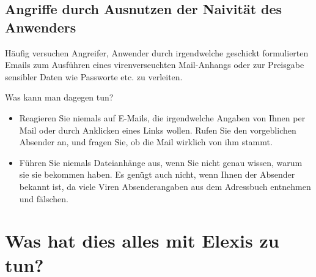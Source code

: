 \subsection{Angriffe durch Ausnutzen der Naivität des Anwenders}

Häufig versuchen Angreifer, Anwender durch irgendwelche geschickt formulierten Emails zum Ausführen eines virenverseuchten Mail-Anhangs oder
zur Preisgabe sensibler Daten wie Passworte etc. zu verleiten.

\medskip

Was kann man dagegen tun?

\begin{itemize}
    \item{Reagieren Sie niemals auf E-Mails, die irgendwelche Angaben von Ihnen per Mail oder durch Anklicken eines Links wollen.
    Rufen Sie den vorgeblichen Absender an, und fragen Sie, ob die Mail wirklich von ihm stammt.}
    \item{Führen Sie niemals Dateianhänge aus, wenn Sie nicht genau wissen, warum sie sie bekommen haben. Es genügt auch nicht, wenn Ihnen der
    Absender bekannt ist, da viele Viren Absenderangaben aus dem Adressbuch entnehmen und fälschen.}
\end{itemize}


\section{Was hat dies alles mit Elexis zu tun?}

